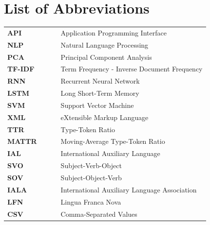 \documentclass[12pt,a4paper]{article}
\numberwithin{figure}{section}
\numberwithin{table}{section}
\numberwithin{definition}{section}
\begin{document}
\section*{List of Abbreviations}

\begin{tabular}{lcl}
\textbf{API} & ~~~ & Application Programming Interface \\
\textbf{NLP} & ~~~ & Natural Language Processing \\
\textbf{PCA} & ~~~ & Principal Component Analysis \\
\textbf{TF-IDF} & ~~~ & Term Frequency - Inverse Document Frequency \\
\textbf{RNN} & ~~~ & Recurrent Neural Network \\
\textbf{LSTM} & ~~~ & Long Short-Term Memory \\
\textbf{SVM} & ~~~ & Support Vector Machine \\
\textbf{XML} & ~~~ & eXtensible Markup Language \\
\textbf{TTR} & ~~~ & Type-Token Ratio \\
\textbf{MATTR} & ~~~ & Moving-Average Type-Token Ratio \\
\textbf{IAL} & ~~~ & International Auxiliary Language \\
\textbf{SVO} & ~~~ & Subject-Verb-Object \\
\textbf{SOV} & ~~~ & Subject-Object-Verb \\
\textbf{IALA} & ~~~ & International Auxiliary Language Association \\
\textbf{LFN} & ~~~ & Lingua Franca Nova \\
\textbf{CSV} & ~~~ & Comma-Separated Values \\


\end{tabular}
\newpage


\pagestyle{fancy}
\fancyhf{}
\fancyhead[L]{\textcolor{gray}{\slshape\nouppercase{\rightmark}}}
\fancyhead[R]{\thepage}
\fancyfoot[R]{\textcolor{gray}{Seminar für Sprachwissenschaft Universität Tübingen}}
\renewcommand{\headrulewidth}{0.4pt}

\renewcommand{\headrulewidth}{0.5pt}
\renewcommand{\footrulewidth}{0.5pt}



\setcounter{page}{1}
\end{document}
